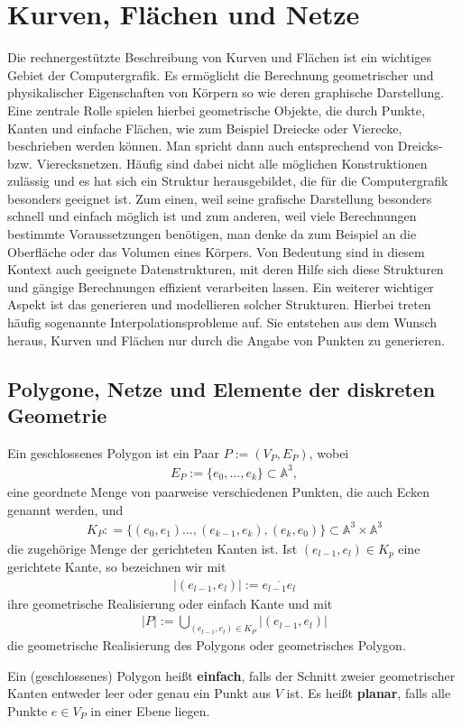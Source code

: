 \section{Kurven, Flächen und  Netze}
Die rechnergestützte Beschreibung von Kurven und Flächen ist ein wichtiges Gebiet der Computergrafik.
Es ermöglicht die Berechnung geometrischer und physikalischer  Eigenschaften von Körpern so wie deren graphische Darstellung.
Eine zentrale Rolle spielen hierbei geometrische Objekte, die durch Punkte, Kanten und einfache Flächen, wie zum Beispiel Dreiecke oder Vierecke, beschrieben werden können. Man spricht dann auch entsprechend von Dreicks- bzw. Vierecksnetzen. Häufig sind dabei nicht alle möglichen Konstruktionen zulässig und es hat sich ein Struktur herausgebildet, die für die Computergrafik besonders geeignet ist. Zum einen, weil seine grafische Darstellung besonders schnell und einfach möglich ist und zum anderen, weil viele Berechnungen bestimmte Voraussetzungen benötigen, man denke da zum Beispiel an die Oberfläche oder das Volumen eines Körpers.
Von Bedeutung sind in diesem Kontext auch geeignete Datenstrukturen, mit deren Hilfe sich diese Strukturen und gängige Berechnungen effizient verarbeiten lassen. 
Ein weiterer wichtiger Aspekt ist das generieren und modellieren solcher Strukturen. Hierbei treten häufig sogenannte Interpolationsprobleme auf. Sie entstehen aus dem Wunsch heraus, Kurven und Flächen nur durch die Angabe von Punkten zu generieren. 

\subsection{Polygone, Netze und Elemente der diskreten Geometrie}
\begin{Definition}
Ein geschlossenes Polygon ist ein Paar $P:=(V_P,E_P)$, wobei   
\begin{align*}
E_P := \{e_0, \hdots, e_k \} \subset \mathbb{A}^3,
\end{align*}
eine geordnete Menge von paarweise verschiedenen Punkten, die auch Ecken genannt werden, und   
\begin{align*}
K_P: = \biggl \{(e_0,e_1)  \hdots, (e_{k-1},e_k), (e_k,e_0) \biggr\} \subset \mathbb{A}^3 \times \mathbb{A}^3
\end{align*}
die zugehörige Menge der gerichteten Kanten ist. 
Ist $(e_{l-1},e_l) \in K_p$ eine gerichtete Kante, so bezeichnen wir mit 
\begin{align*}
|(e_{l-1},e_l)| := \overline{e_{l-1}e_l} 
\end{align*}
ihre geometrische Realisierung oder einfach Kante und mit 
\begin{align*}
|P|:= \bigcup_{(e_{l-1},e_l) \in K_P} |(e_{l-1},e_l)|
\end{align*}
 die geometrische Realisierung des Polygons oder geometrisches Polygon.


Ein (geschlossenes) Polygon heißt \textbf{einfach}, falls der Schnitt zweier geometrischer Kanten  entweder leer oder genau ein Punkt aus $V$ ist.
Es heißt \textbf{planar}, falls alle Punkte $e \in V_P$ in einer Ebene liegen.
\end{Definition}


